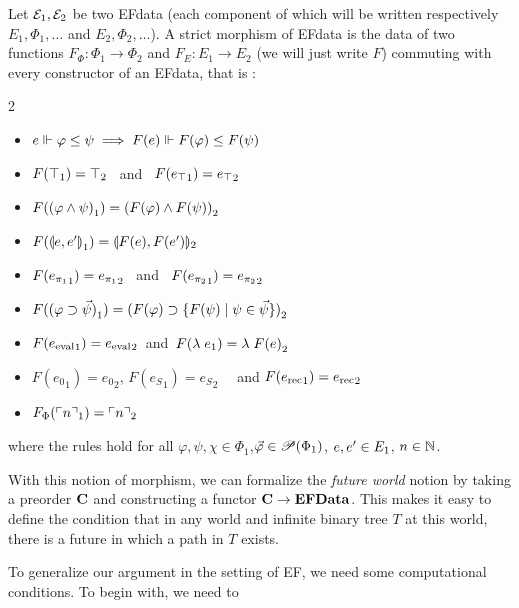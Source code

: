 \documentclass[a4paper,UKenglish,cleveref, autoref, thm-restate]{lipics-v2021}
\begin{document}
\begin{definition}
Let $\mathcal{E}_1,\mathcal{E}_2$ be two EFdata (each component of which will be written respectively $E_1,\Phi_1,\ldots$ and $E_2,\Phi_2,\ldots$).
A strict morphism of EFdata is the data of two functions $F_{\Phi} : \Phi_1 \to \Phi_2$ and $F_E : E_1 \to E_2$ (we will just write $F$) commuting with every constructor of an EFdata, that is :
\begin{multicols}{2}
  \begin{itemize}
  \item $e \Vdash \varphi \leq \psi \implies F(e) \Vdash F(\varphi) \leq F(\psi)$
  \item $F(\top_1) = \top_2$ ~and~ $F({e_\top}_1) = {e_\top}_2$
  \item $F({(\varphi \land \psi)}_1) = {(F(\varphi) \land F(\psi))}_2$
  \item $F({\llparenthesis e,e'\rrparenthesis}_1) = \llparenthesis F(e),F(e')\rrparenthesis_2$
  \item $F({e_{\pi_1}}_1) = {e_{\pi_1}}_2$ ~and~ $F({e_{\pi_2}}_1) = {e_{\pi_2}}_2$
  \item $F({(\varphi \supset \vec\psi)}_1) = {(F(\varphi) \supset \{F(\psi)\mid \psi \in \vec \psi\})}_2$
  \item $F({e_{\mathrm{eval}}}_1) = {e_{\mathrm{eval}}}_2$ \,and\, $F({\lambda\;e}_1) = {\lambda\;F(e)}_2$
  \item $F({e_{0}}_1) = {e_{0}}_2$, $F({e_{S}}_1) = {e_S}_2$ ~~and $F({e_{\mathrm{rec}}}_1) = {e_{\mathrm{rec}}}_2$
  \item $F_{\Phi}({\ulcorner n\urcorner}_1) = {\ulcorner n\urcorner}_2$
  \end{itemize}
\end{multicols}
\noindent where the rules hold for all $\varphi,\psi,\chi\in\Phi_1$,$\vec\varphi\in\mathscr{P}(\Phi_1)$, $e,e'\in E_1$, $n\in\mathbb N$.



\end{definition}

With this notion of morphism, we can formalize the \emph{future world} notion by taking
a preorder $\mathbf{C}$ and constructing a functor $\mathbf{C} \to \mathbf{EFData}$.
This makes it easy to define the condition that in any world and infinite binary tree $T$
at this world, there is a future in which a path in $T$ exists.


To generalize our argument in the setting of EF, we need some computational conditions. To begin with, we need to
\end{document}
